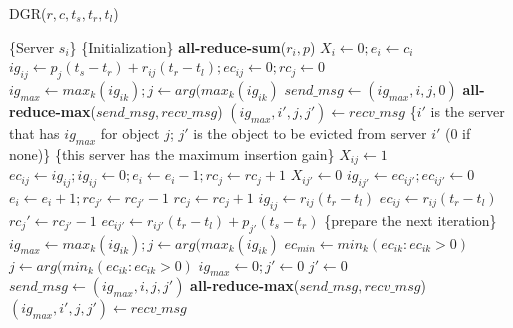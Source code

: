 			\begin{algorithm}[tbp]\footnotesize
				\caption{DGR($r, c, t_s , t_r , t_l$)}\label{alg:Example}
				\begin{algorithmic}[1]
					\State \{Server $s_i$\}
					\State \{Initialization\}
					\State \textbf{all-reduce-sum}($r_i, p$)
					\State $X_i \gets 0; e_i \gets c_i$
						\State $ig_{ij} \gets p_j (t_s - t_r) + r_{ij} (t_r - t_l); ec_{ij} \gets 0; rc_j \gets 0$
					\EndFor
					\State $ig_{max} \gets max_k (ig_{ik}); j \gets arg(max_k(ig_{ik})$
					\State $send\_msg \gets (ig_{max}, i, j, 0)$
					\State \textbf{all-reduce-max}($send\_msg, recv\_msg$)
					\State $(ig_{max}, i', j, j') \gets recv\_msg$
					\State \{$i'$ is the server that has $ig_{max}$ for object $j$; $j'$ is the object to be evicted from server $i'$ (0 if none)\}
							\State \{this server has the maximum insertion gain\}
							\State $X_{ij} \gets 1$
							\State $ec_{ij} \gets ig_{ij}; ig_{ij} \gets 0; e_i \gets e_i - 1; rc_j \gets rc_j + 1$
								\State $X_{ij'} \gets 0$
								\State $ig_{ij'} \gets ec_{ij'}; ec_{ij'} \gets 0$
								\State $e_i \gets e_i + 1; rc_{j'} \gets rc_{j'} - 1$
							\EndIf
						\Else
							\State $rc_j \gets rc_j + 1$
								\State $ig_{ij} \gets r_{ij} (t_r - t_l)$
							\Else
								\State $ec_{ij} \gets r_{ij} (t_r - t_l)$
							\EndIf
								\State $rc_j' \gets rc_{j'} - 1$
									\State $ec_{ij'} \gets r_{ij'} (t_r - t_l) + p_{j'} (t_s - t_r)$
								\EndIf
							\EndIf
						\EndIf
						\State \{prepare the next iteration\}
						\State $ig_{max} \gets max_k (ig_{ik}); j \gets arg(max_k(ig_{ik})$
						\State $ec_{min} \gets min_k (ec_{ik} : ec_{ik} > 0)$
						\State $j \gets arg(min_k(ec_{ik} : ec_{ik} > 0)$
								\State $ig_{max} \gets 0; j' \gets 0$
							\EndIf
						\Else 
							\State $j' \gets 0$
						\EndIf
						\State $send\_msg \gets (ig_{max}, i, j, j')$
						\State \textbf{all-reduce-max}($send\_msg, recv\_msg$)
						\State $(ig_{max}, i', j, j') \gets recv\_msg$
					\EndWhile
				 
				\end{algorithmic}
			\end{algorithm}

